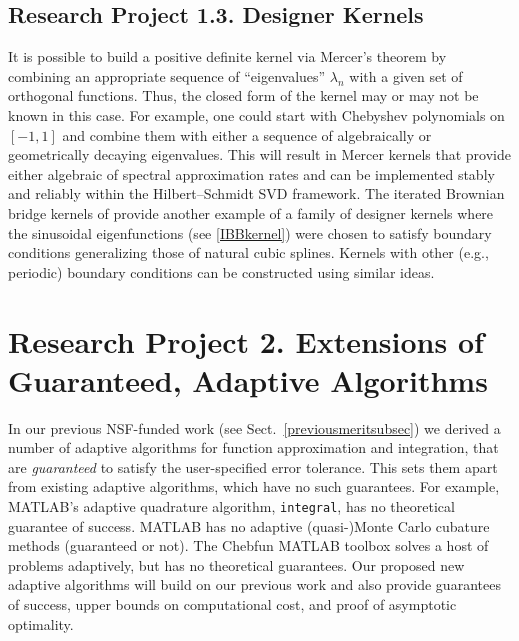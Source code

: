 \documentclass[11pt]{NSFamsart}
\begin{document}
\subsection*{Research Project 1.3. Designer Kernels}\label{SectDesignerKernels}

It is possible to build a positive definite kernel via Mercer's theorem by combining an appropriate sequence of
``eigenvalues'' $\lambda_n$ with a given set of orthogonal functions. Thus, the closed form of the kernel may or may not be known in this case. For example, one could start with Chebyshev polynomials on $[-1,1]$ and combine them with either a sequence of algebraically or geometrically decaying eigenvalues. This will result in Mercer kernels that provide either algebraic of spectral approximation rates and can be implemented stably and reliably within the Hilbert--Schmidt SVD framework. The iterated Brownian bridge kernels of \cite{CavorettoEtAl14} provide another example of a family of designer kernels where the sinusoidal eigenfunctions (see \eqref{IBBkernel}) were chosen to satisfy boundary conditions generalizing those of natural cubic splines. Kernels with other (e.g., periodic) boundary conditions can be constructed using similar ideas.

\section*{Research Project 2. Extensions of Guaranteed, Adaptive Algorithms}\label{SectGAIL}

In our previous NSF-funded work (see Sect.\ \ref{previousmeritsubsec}) we derived a number of  adaptive algorithms for function approximation and integration, that are \emph{guaranteed} to satisfy the user-specified error tolerance.  This sets them apart from existing adaptive algorithms, which have no such guarantees.  For example, MATLAB's adaptive quadrature algorithm, \texttt{integral}, has no theoretical guarantee of success.  MATLAB has no adaptive (quasi-)Monte Carlo cubature methods (guaranteed or not).  The Chebfun MATLAB toolbox \citep{TrefEtal14} solves a host of problems adaptively, but has no theoretical guarantees.  Our proposed new adaptive algorithms will build on our previous work and also provide guarantees of success, upper bounds on computational cost, and proof of asymptotic optimality.
\end{document}
